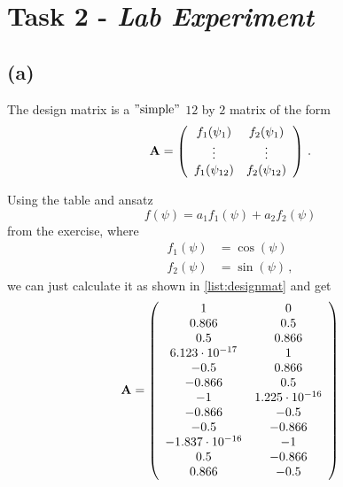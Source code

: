 \section{Task 2 - \textit{Lab Experiment}}

\subsection*{(a)}

The design matrix is a $"\text{simple}"$ $12$ by $2$ matrix of the form
\begin{equation*}
    \textbf{A} = \left(
        \begin{array}{c c}
            f_1(\psi_1) & f_2(\psi_1) \\
            \vdots & \vdots \\
            f_1(\psi_{12}) & f_2(\psi_{12}) \\
        \end{array}
    \right) \,.
\end{equation*}

Using the table and ansatz 
\begin{equation*}
    f(\psi) = a_1 f_1(\psi) + a_2 f_2(\psi)
\end{equation*}
from the exercise, where
\begin{align*}
    f_1(\psi) &= \cos (\psi) \\
    f_2(\psi) &= \sin (\psi) \,,
\end{align*}
we can just calculate it as shown in \autoref{list:designmat} and get
\begin{equation*}
    \textbf{A} = \left(
        \begin{array}{c c}
             1                    &  0  \\
             0.866                &  0.5 \\
             0.5                  &  0.866 \\
             6.123 \cdot 10^{-17} &  1 \\
            -0.5                  &  0.866 \\
            -0.866                &  0.5 \\
            -1                    &  1.225 \cdot 10^{-16} \\
            -0.866                & -0.5 \\
            -0.5                  & -0.866 \\
            -1.837 \cdot 10^{-16} & -1 \\
            0.5                   & -0.866 \\
            0.866                 & -0.5 \\
        \end{array}
    \right)
\end{equation*}

